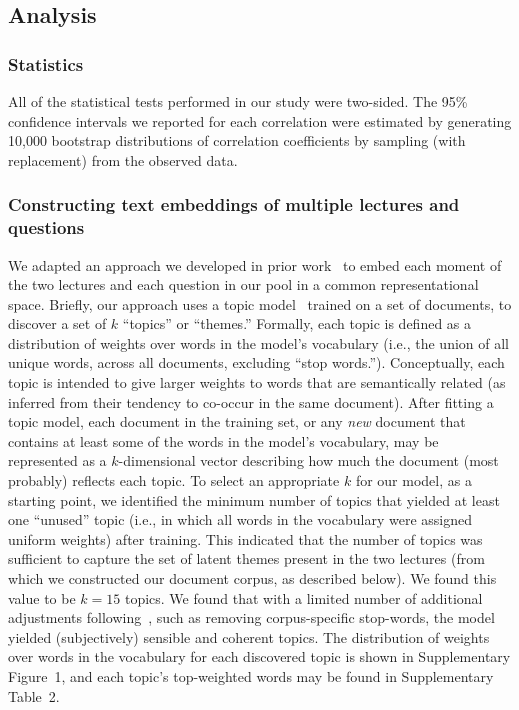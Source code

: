 \documentclass[10pt]{article}
\newcommand{\topics}{2}
\newcommand{\topicWordWeights}{1}
\begin{document}
\subsection*{Analysis}

\subsubsection*{Statistics}

All of the statistical tests performed in our study were two-sided. The 95\%
confidence intervals we reported for each correlation were estimated by
generating 10,000 bootstrap distributions of correlation coefficients by
sampling (with replacement) from the observed data.

\subsubsection*{Constructing text embeddings of multiple lectures and questions}\label{subsec:topic-modeling}

We adapted an approach we developed in prior work~\citep{HeusEtal21} to embed
each moment of the two lectures and each question in our pool in a common
representational space. Briefly, our approach uses a topic model~\citep[Latent
Dirichlet Allocation; ][]{BleiEtal03} trained on a set of documents, to
discover a set of $k$ ``topics'' or ``themes.'' Formally, each topic is
defined as a distribution of weights over words in the model's vocabulary
(i.e., the union of all unique words, across all documents, excluding ``stop
words.''). Conceptually, each topic is intended to give larger weights to words
that are semantically related (as inferred from their tendency to co-occur in
the same document). After fitting a topic model, each document in the training
set, or any \textit{new} document that contains at least some of the words in
the model's vocabulary, may be represented as a $k$-dimensional vector
describing how much the document (most probably) reflects each topic. To select
an appropriate $k$ for our model, as a starting point, we identified the
minimum number of topics that yielded at least one ``unused'' topic (i.e., in
which all words in the vocabulary were assigned uniform weights) after
training. This indicated that the number of topics was sufficient to capture
the set of latent themes present in the two lectures (from which we constructed
our document corpus, as described below). We found this value to be $k = 15$
topics. We found that with a limited number of additional adjustments
following~\citep{BoydEtal14}, such as removing corpus-specific stop-words, the
model yielded (subjectively) sensible and coherent topics. The distribution of
weights over words in the vocabulary for each discovered topic is shown in
Supplementary Figure~\topicWordWeights, and each topic's top-weighted words may
be found in Supplementary Table~\topics.
\end{document}

